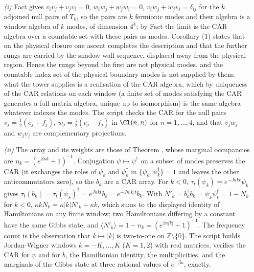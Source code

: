 \emph{(i)} Fact  gives $v_iv_j + v_jv_i = 0$, $w_iw_j + w_jw_i = 0$, $v_iw_j + w_jv_i = \delta_{ij}$ for the $k$ adjoined null pairs of $T_k$, so the pairs are $k$ fermionic modes and their algebra is a window algebra of $k$ modes, of dimension $4^{k}$; by Fact  the limit is the CAR algebra over a countable set with these pairs as modes. Corollary (1) states that on the physical closure one ascent completes the description and that the further rungs are carried by the shadow-wall sequence, displaced away from the physical region. Hence the rungs beyond the first are not physical modes, and the countable index set of the physical boundary modes is not supplied by them; what the tower supplies is a realisation of the CAR algebra, which by uniqueness of the CAR relations on each window (a finite set of modes satisfying the CAR generates a full matrix algebra, unique up to isomorphism) is the same algebra whatever indexes the modes. The script checks the CAR for the null pairs $v_j = \tfrac12(e_j + f_j)$, $w_j = \tfrac12(e_j - f_j)$ in $\Cl(n, n)$ for $n = 1, \dots, 4$, and that $v_jw_j$ and $w_jv_j$ are complementary projections.

\emph{(ii)} The array and its weights are those of Theorem , whose marginal occupancies are $n_k = (e^{\beta\kappa k} + 1)^{-1}$. Conjugation $\psi \mapsto \psi^{\dagger}$ on a subset of modes preserves the CAR (it exchanges the roles of $\psi_k$ and $\psi_k^{\dagger}$ in $\{\psi_k, \psi_k^{\dagger}\} = 1$ and leaves the other anticommutators zero), so the $b_k$ are a CAR array. For $k < 0$, $\tau_t(\psi_k) = e^{-J\kappa kt}\psi_k$ gives $\tau_t(b_k) = \tau_t(\psi_k)^{\dagger} = e^{J\kappa kt}b_k = e^{-J\kappa|k|t}b_k$. With $N'_k = b_k^{\dagger}b_k = \psi_k\psi_k^{\dagger} = 1 - N_k$ for $k < 0$, $\kappa kN_k = \kappa|k|N'_k + \kappa k$, which sums to the displayed identity of Hamiltonians on any finite window; two Hamiltonians differing by a constant have the same Gibbs state, and $\langle N'_k\rangle = 1 - n_k = (e^{\beta\kappa|k|} + 1)^{-1}$. The frequency count is the observation that $k \mapsto |k|$ is two-to-one on $\mathbb{Z}\setminus\{0\}$. The script builds Jordan-Wigner windows $k = -K, \dots, K$ ($K = 1, 2$) with real matrices, verifies the CAR for $\psi$ and for $b$, the Hamiltonian identity, the multiplicities, and the marginals of the Gibbs state at three rational values of $e^{-\beta\kappa}$, exactly.

